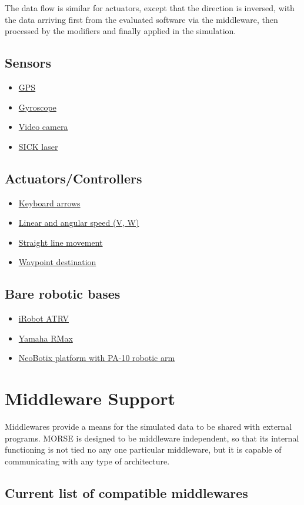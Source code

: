 \documentclass[twoside,a4paper,10pt]{report}
\newcommand{\dokutitlelevelone}[1]{\chapter{#1}}
\newcommand{\dokutitleleveltwo}[1]{\section{#1}}
\newcommand{\dokuitem}{\item}
\begin{document}
The data flow is similar for actuators, except that the direction is inversed, with the data arriving first from the evaluated software via the middleware, then processed by the modifiers and finally applied in the simulation.


\dokutitleleveltwo{Sensors}
\label{029aee483db9ae244d7a5cb353e74602}%

\begin{itemize}
\dokuitem  \hyperref[11648e4e66e7ed6a86cb7f1d0cf604fe]{ GPS}
\dokuitem  \hyperref[6b3b2d8500522343e080755f0e0aa4fe]{ Gyroscope}
\dokuitem  \hyperref[dd6d2dcc679d12b9430a9787bab45b33]{ Video camera}
\dokuitem  \hyperref[8d7d5ffd0031f2449cbeaef424c22d75]{ SICK laser}
\end{itemize}

\dokutitleleveltwo{Actuators/Controllers}
\label{2068e59180763f350d66a42e828e7f96}%

\begin{itemize}
\dokuitem  \hyperref[388a56dbb62a010dc26a378981346247]{ Keyboard arrows}
\dokuitem  \hyperref[cdf7afd8bc8dbb764b14c987cea8effd]{ Linear and angular speed (V, W)}
\dokuitem  \hyperref[6990a54322d9232390a784c5c9247dd6]{ Straight line movement}
\dokuitem  \hyperref[f75862c2bd0040eb683048c313dcaaa8]{ Waypoint destination}
\end{itemize}

\dokutitleleveltwo{Bare robotic bases}
\label{d69ac14cd721dd995822d4e984f48116}%

\begin{itemize}
\dokuitem  \hyperref[4fd87f5742582d412dce2c6ad5304937]{ iRobot ATRV}
\dokuitem  \hyperref[311954cf2f831f2289fb7fff75d15a7d]{ Yamaha RMax}
\dokuitem  \hyperref[3c16132d99703978dacd02b0808a4270]{ NeoBotix platform with PA-10 robotic arm}
\end{itemize}

\dokutitlelevelone{Middleware Support}
\label{4303941a1597ae94654bd96854480742}%
\label{9a05db9c4b60b0527010fd997682f523}%

Middlewares provide a means for the simulated data to be shared with external programs. MORSE is designed to be middleware independent, so that its internal functioning is not tied no any one particular middleware, but it is capable of communicating with any type of architecture.


\dokutitleleveltwo{Current list of compatible middlewares}
\label{92515de7e8c9f43d6ca122cbbfd1809e}%
\end{document}
